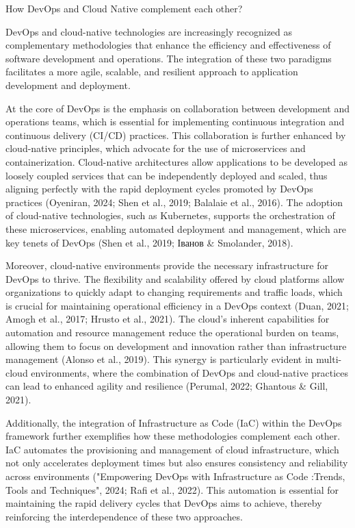 How DevOps and Cloud Native complement each other?

DevOps and cloud-native technologies are increasingly recognized as complementary methodologies that enhance the efficiency and effectiveness of software development and operations. The integration of these two paradigms facilitates a more agile, scalable, and resilient approach to application development and deployment.

At the core of DevOps is the emphasis on collaboration between development and operations teams, which is essential for implementing continuous integration and continuous delivery (CI/CD) practices. This collaboration is further enhanced by cloud-native principles, which advocate for the use of microservices and containerization. Cloud-native architectures allow applications to be developed as loosely coupled services that can be independently deployed and scaled, thus aligning perfectly with the rapid deployment cycles promoted by DevOps practices (Oyeniran, 2024; Shen et al., 2019; Balalaie et al., 2016). The adoption of cloud-native technologies, such as Kubernetes, supports the orchestration of these microservices, enabling automated deployment and management, which are key tenets of DevOps (Shen et al., 2019; Іванов & Smolander, 2018).

Moreover, cloud-native environments provide the necessary infrastructure for DevOps to thrive. The flexibility and scalability offered by cloud platforms allow organizations to quickly adapt to changing requirements and traffic loads, which is crucial for maintaining operational efficiency in a DevOps context (Duan, 2021; Amogh et al., 2017; Hrusto et al., 2021). The cloud's inherent capabilities for automation and resource management reduce the operational burden on teams, allowing them to focus on development and innovation rather than infrastructure management (Alonso et al., 2019). This synergy is particularly evident in multi-cloud environments, where the combination of DevOps and cloud-native practices can lead to enhanced agility and resilience (Perumal, 2022; Ghantous & Gill, 2021).

Additionally, the integration of Infrastructure as Code (IaC) within the DevOps framework further exemplifies how these methodologies complement each other. IaC automates the provisioning and management of cloud infrastructure, which not only accelerates deployment times but also ensures consistency and reliability across environments ("Empowering DevOps with Infrastructure as Code :Trends, Tools and Techniques", 2024; Rafi et al., 2022). This automation is essential for maintaining the rapid delivery cycles that DevOps aims to achieve, thereby reinforcing the interdependence of these two approaches.

